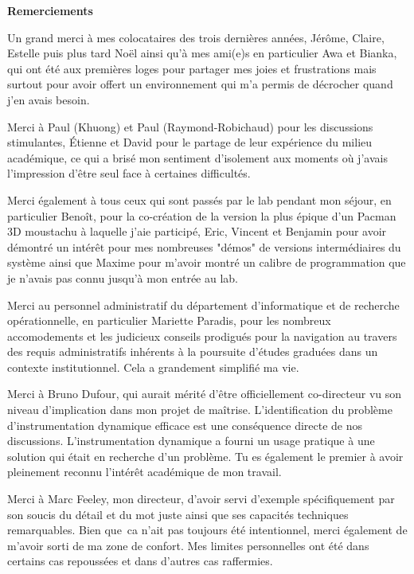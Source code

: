 \begin{center}
\textbf{\large Remerciements}
\end{center}

Un grand merci \`a mes colocataires des trois derni\`eres ann\'ees, J\'er\^ome,
Claire, Estelle puis plus tard No\"el ainsi qu'\`a mes ami(e)s en particulier
Awa et Bianka, qui ont \'et\'e aux premi\`eres loges pour partager mes joies et
frustrations mais surtout pour avoir offert un environnement qui m'a permis de
d\'ecrocher quand j'en avais besoin.

Merci \`a Paul (Khuong) et Paul (Raymond-Robichaud) pour les discussions
stimulantes, \'Etienne et David pour le partage de leur exp\'erience du milieu
acad\'emique, ce qui a bris\'e mon sentiment d'isolement aux moments o\`u j'avais
l'impression d'\^etre seul face \`a certaines difficult\'es.

Merci \'egalement \`a tous ceux qui sont pass\'es par le lab pendant mon s\'ejour, en
particulier Beno\^it, pour la co-cr\'eation de la version la plus \'epique d'un
Pacman 3D moustachu \`a laquelle j'aie particip\'e, Eric, Vincent et Benjamin pour
avoir d\'emontr\'e un int\'er\^et pour mes nombreuses "d\'emos" de versions interm\'ediaires
du syst\`eme ainsi que Maxime pour m'avoir montr\'e un calibre de programmation que
je n'avais pas connu jusqu'\`a mon entr\'ee au lab.

Merci au personnel administratif du d\'epartement d'informatique
et de recherche op\'erationnelle, en particulier Mariette Paradis, pour les
nombreux accomodements et les judicieux conseils prodigu\'es pour la navigation
au travers des requis administratifs inh\'erents \`a la poursuite d'\'etudes gradu\'ees
dans un contexte institutionnel. Cela a grandement simplifi\'e ma vie.

Merci \`a Bruno Dufour, qui aurait m\'erit\'e d'\^etre officiellement
co-directeur vu son niveau d'implication dans mon projet de ma\^itrise.
L'identification du probl\`eme d'instrumentation dynamique efficace est une
cons\'equence directe de nos discussions. L'instrumentation dynamique a fourni
un usage pratique \`a une solution qui \'etait en recherche d'un probl\`eme. Tu
es \'egalement le premier \`a avoir pleinement reconnu l'int\'er\^et
acad\'emique de mon travail.

Merci \`a Marc Feeley, mon directeur, d'avoir servi d'exemple sp\'ecifiquement
par son soucis du d\'etail et du mot juste ainsi que ses capacit\'es techniques
remarquables.  Bien que \,ca n'ait pas toujours \'et\'e intentionnel, merci
\'egalement de m'avoir sorti de ma zone de confort. Mes limites personnelles
ont \'et\'e dans certains cas repouss\'ees et dans d'autres cas raffermies. 
